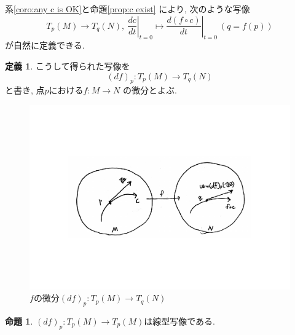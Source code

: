 \documentclass[a4j,12pt]{jarticle}
\theoremstyle{definition}
\newtheorem{definition}[theorem]{定義}
\newtheorem{proposition}[theorem]{命題}
\begin{document}
系\ref{coro:any c is OK}と命題\ref{prop:c exist}
により, 次のような写像
$$T_p(M)\to T_q(N),\ 
\left .\frac{dc}{dt}\right|_{t=0}\mapsto
\left .\frac{d(f\circ c)}{dt}\right|_{t=0}
\ (q=f(p))$$
が自然に定義できる. 
\begin{definition}\label{def:differential}
    こうして得られた写像を
    $$(df)_p:T_p(M)\to T_q(N)$$
    と書き, 点$p$における$f:M\to N$
    の微分とよぶ. 
\end{definition}
\begin{figure}[H]
    \centering
    \includegraphics[keepaspectratio, scale=0.5]{differential.pdf}
    \caption{$f$の微分$(df)_p:T_p(M)\to T_q(N)$}
    \label{differential}
   \end{figure}
\begin{proposition}
    $(df)_p:T_p(M)\to T_p(M)$は線型写像である. 
\end{proposition}
\end{document}
